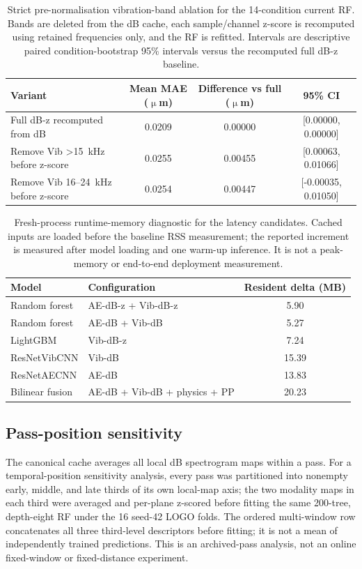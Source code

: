 \begin{table}[htbp]
\centering
\caption{Strict pre-normalisation vibration-band ablation for the
14-condition current RF. Bands are deleted from the dB cache, each
sample/channel z-score is recomputed using retained frequencies only, and the
RF is refitted. Intervals are descriptive paired condition-bootstrap 95\%
intervals versus the recomputed full dB-z baseline.}
\label{tab:supp-prez-band-ablation}
\begin{tabular}{@{}lccc@{}}
\toprule
Variant & Mean MAE (\(\upmu\)m) & Difference vs full (\(\upmu\)m) & 95\% CI \\
\midrule
Full dB-z recomputed from dB & 0.0209 & 0.00000 & [0.00000, 0.00000] \\
Remove Vib >15~kHz before z-score & 0.0255 & 0.00455 & [0.00063, 0.01066] \\
Remove Vib 16--24~kHz before z-score & 0.0254 & 0.00447 & [-0.00035, 0.01050] \\
\bottomrule
\end{tabular}
\end{table}

\begin{table}[htbp]
\centering
\caption{Fresh-process runtime-memory diagnostic for the latency candidates.
Cached inputs are loaded before the baseline RSS measurement; the reported
increment is measured after model loading and one warm-up inference. It is
not a peak-memory or end-to-end deployment measurement.}
\label{tab:supp-runtime-memory}
\begin{tabular}{@{}llc@{}}
\toprule
Model & Configuration & Resident delta (MB) \\
\midrule
Random forest & AE-dB-z + Vib-dB-z & 5.90 \\
Random forest & AE-dB + Vib-dB & 5.27 \\
LightGBM & Vib-dB-z & 7.24 \\
ResNetVibCNN & Vib-dB & 15.39 \\
ResNetAECNN & AE-dB & 13.83 \\
Bilinear fusion & AE-dB + Vib-dB + physics + PP & 20.23 \\
\bottomrule
\end{tabular}
\end{table}

\subsection*{Pass-position sensitivity}

The canonical cache averages all local dB spectrogram maps within a pass.
For a temporal-position sensitivity analysis, every pass was partitioned
into nonempty early, middle, and late thirds of its own local-map axis;
the two modality maps in each third were averaged and per-plane z-scored
before fitting the same 200-tree, depth-eight RF under the 16 seed-42
LOGO folds. The ordered multi-window row concatenates all three
third-level descriptors before fitting; it is not a mean of independently
trained predictions. This is an archived-pass analysis, not an online
fixed-window or fixed-distance experiment.

